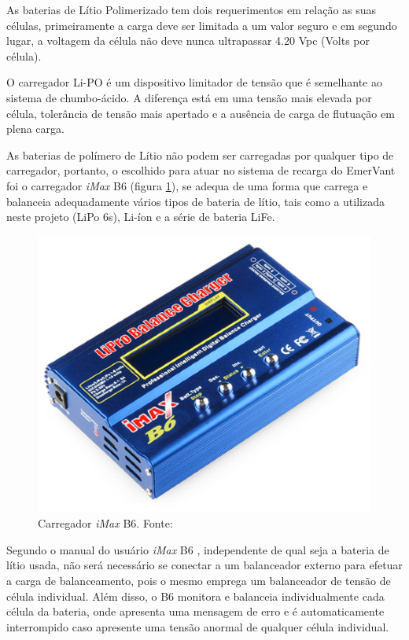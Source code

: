 As baterias de Lítio Polimerizado tem dois requerimentos em relação as suas células, primeiramente a carga deve ser limitada a um valor seguro e em segundo lugar, a voltagem da célula não deve nunca ultrapassar 4.20 Vpc (Volts por célula). \cite{gibbs}

O carregador Li-PO é um dispositivo limitador de tensão que é semelhante ao sistema de chumbo-ácido. A diferença está em uma tensão mais elevada por célula, tolerância de tensão mais apertado e a ausência de carga de flutuação em plena carga.

As baterias de polímero de Lítio não podem ser carregadas por qualquer tipo de carregador, portanto, o escolhido para atuar no 
sistema de recarga do EmerVant foi o carregador \textit{iMax} B6 (figura \ref{fig:carregador1}), se adequa de uma forma que carrega e 
balanceia adequadamente vários tipos de bateria de lítio, tais como a utilizada neste projeto (LiPo 6s), Li-íon e a série de bateria LiFe.


 \begin{figure}[H]
    \centering
	\includegraphics[keepaspectratio=true,scale=0.2]{figuras/carregador1.eps}
    \caption{Carregador \textit{iMax} B6. Fonte: \cite{carregador1}}
    \label{fig:carregador1}
\end{figure}


Segundo o manual do usuário \textit{iMax} B6 \cite{ibmax}, independente de qual seja a bateria de lítio usada, não será necessário se conectar a um balanceador externo para efetuar a carga de balanceamento, pois o mesmo emprega um balanceador de tensão de célula individual. Além disso, o B6 monitora e balanceia individualmente cada célula da bateria, onde apresenta uma mensagem de erro e é automaticamente interrompido caso apresente uma tensão anormal de qualquer célula individual. 

